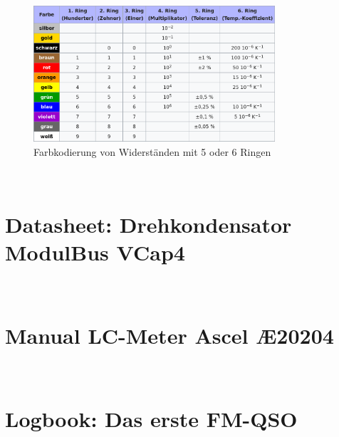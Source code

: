     \begin{figure}[h]
        \centering
        \includegraphics[width=0.8\textwidth]{appendix/formulary/R-Farbcode.png}
        \caption{Farbkodierung von Widerständen mit 5 oder 6 Ringen \cite{wpwiderstand}}
        \label{fig:r-farbcode}
    \end{figure}

\clearpage\newpage ~


\chapter{Datasheet: Drehkondensator ModulBus VCap4}
    \label{att:vcap}

    

\clearpage\newpage ~


\chapter{Manual LC-Meter Ascel Æ20204}
    \label{att:ae20204}

    

\clearpage\newpage ~


\chapter{Logbook: Das erste FM-QSO}
    \label{att:first-qso}

    
